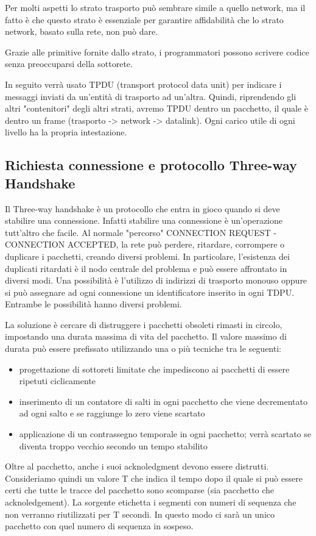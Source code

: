 Per molti aspetti lo strato trasporto può sembrare simile a quello network, ma il fatto è che questo strato è essenziale per garantire affidabilità che lo strato network, basato sulla rete, non può dare. 

Grazie alle primitive fornite dallo strato, i programmatori possono scrivere codice senza preoccuparsi della sottorete.

In seguito verrà usato TPDU (transport protocol data unit) per indicare i messaggi inviati da un'entità di trasporto ad un'altra. 
Quindi, riprendendo gli altri "contenitori" degli altri strati, avremo TPDU dentro un pacchetto, il quale è dentro un frame
(trasporto -> network -> datalink).
Ogni carico utile di ogni livello ha la propria intestazione. 

\subsection{Richiesta connessione e protocollo Three-way Handshake}

Il Three-way handshake è un protocollo che entra in gioco quando si deve stabilire una connessione.
Infatti stabilire una connessione è un'operazione tutt'altro che facile.
Al normale "percorso" CONNECTION REQUEST - CONNECTION ACCEPTED, la rete può perdere, ritardare, corrompere o duplicare i pacchetti, creando diversi problemi.
In particolare, l'esistenza dei duplicati ritardati è il nodo centrale del problema e può essere affrontato in diversi modi.
Una possibilità è l'utilizzo di indirizzi di trasporto monouso oppure si può assegnare ad ogni connessione un identificatore inserito in ogni TDPU.
Entrambe le possibilità hanno diversi problemi.

La soluzione è cercare di distruggere i pacchetti obsoleti rimasti in circolo, impostando una durata massima di vita del pacchetto.
Il valore massimo di durata può essere prefissato utilizzando una o più tecniche tra le seguenti:
\begin{itemize}
\item progettazione di sottoreti limitate che impediscono ai pacchetti di essere ripetuti ciclicamente
\item inserimento di un contatore di salti in ogni pacchetto che viene decrementato ad ogni salto e se raggiunge lo zero viene scartato
\item applicazione di un contrassegno temporale in ogni pacchetto; verrà scartato se diventa troppo vecchio secondo un tempo stabilito
\end{itemize}
Oltre al pacchetto, anche i suoi acknoledgment devono essere distrutti.
Consideriamo quindi un valore T che indica il tempo dopo il quale si può essere certi che tutte le tracce del pacchetto sono scomparse (sia pacchetto che acknoledgement).
La sorgente etichetta i segmenti con numeri di sequenza che non verranno riutilizzati per T secondi.
In questo modo ci sarà un unico pacchetto con quel numero di sequenza in sospeso.

